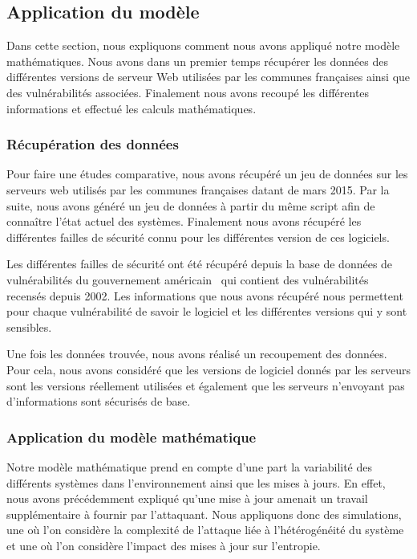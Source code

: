 



\subsection{Application du modèle}\label{sec:simulation}
Dans cette section, nous expliquons comment nous avons appliqué notre modèle mathématiques.
Nous avons dans un premier temps récupérer les données des différentes versions de serveur Web utilisées par les communes françaises ainsi que des vulnérabilités associées.
Finalement nous avons recoupé les différentes informations et effectué les calculs mathématiques.

\subsubsection{Récupération des données}\label{sec:recupData}
Pour faire une études comparative, nous avons récupéré un jeu de données sur les serveurs web utilisés par les communes françaises datant de mars 2015.
Par la suite, nous avons généré un jeu de données à partir du même script afin de connaître l'état actuel des systèmes.
Finalement nous avons récupéré les différentes failles de sécurité connu pour les différentes version de ces logiciels.

Les différentes failles de sécurité ont été récupéré depuis la base de données de vulnérabilités du gouvernement américain~\cite{vulnDatabase} qui contient des vulnérabilités recensés depuis 2002.
Les informations que nous avons récupéré nous permettent pour chaque vulnérabilité de savoir le logiciel et les différentes versions qui y sont sensibles.


Une fois les données trouvée, nous avons réalisé un recoupement des données.
Pour cela, nous avons considéré que les versions de logiciel donnés par les serveurs sont les versions réellement utilisées et également que les serveurs n'envoyant pas d'informations sont sécurisés de base.


\subsubsection{Application du modèle mathématique}
Notre modèle mathématique prend en compte d'une part la variabilité des différents systèmes dans l'environnement ainsi que les mises à jours.
En effet, nous avons précédemment expliqué qu'une mise à jour amenait un travail supplémentaire à fournir par l'attaquant.
Nous appliquons donc des simulations, une où l'on considère la complexité de l'attaque liée à l'hétérogénéité du système et une où l'on considère l'impact des mises à jour sur l'entropie.

